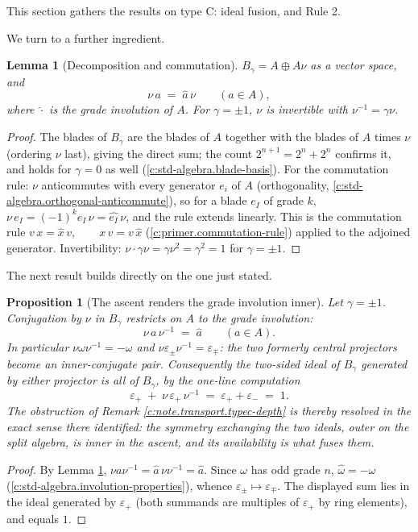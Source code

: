 \documentclass[11pt]{article}
\newtheorem{proposition}[theorem]{Proposition}
\newtheorem{lemma}[theorem]{Lemma}
\theoremstyle{definition}
\theoremstyle{plain}
\begin{document}
This section gathers the results on type C: ideal fusion, and Rule 2.

We turn to a further ingredient.

\begin{lemma}[Decomposition and commutation]\label{c:transport.decomposition-commutation}
$B_\gamma = A \oplus A\nu$ as a vector space, and
\[
\nu\, a \;=\; \hat{a}\, \nu \qquad (a \in A),
\]
where $\hat{\cdot}$ is the grade involution of $A$. For $\gamma = \pm 1$, $\nu$ is invertible with $\nu^{-1} = \gamma\nu$.
\end{lemma}
\begin{proof}
The blades of $B_\gamma$ are the blades of $A$ together with the blades of $A$ times $\nu$ (ordering $\nu$ last), giving the direct sum; the count $2^{n+1} = 2^n + 2^n$ confirms it, and holds for $\gamma = 0$ as well \cite{Chevalley1997} (\ref{c:std-algebra.blade-basis}). For the commutation rule: $\nu$ anticommutes with every generator $e_i$ of $A$ (orthogonality, \ref{c:std-algebra.orthogonal-anticommute}), so for a blade $e_I$ of grade $k$, $\nu\, e_I = (-1)^k e_I\, \nu = \hat{e_I}\,\nu$, and the rule extends linearly. This is the commutation rule $v\,x = \hat{x}\,v, \qquad x\,v = v\,\hat{x}$ (\ref{c:primer.commutation-rule}) applied to the adjoined generator. Invertibility: $\nu \cdot \gamma\nu = \gamma \nu^2 = \gamma^2 = 1$ for $\gamma = \pm 1$.

\end{proof}

The next result builds directly on the one just stated.

\begin{proposition}[The ascent renders the grade involution inner]\label{c:transport.ascent-renders-grade-involution-inner}
Let $\gamma = \pm 1$. Conjugation by $\nu$ in $B_\gamma$ restricts on $A$ to the grade involution:
\[
\nu\, a\, \nu^{-1} \;=\; \hat{a} \qquad (a \in A).
\]
In particular $\nu \omega \nu^{-1} = -\omega$ and $\nu \varepsilon_\pm \nu^{-1} = \varepsilon_\mp$: the two formerly central projectors become an inner-conjugate pair. Consequently the two-sided ideal of $B_\gamma$ generated by either projector is all of $B_\gamma$, by the one-line computation
\[
\varepsilon_+ \;+\; \nu\,\varepsilon_+\,\nu^{-1} \;=\; \varepsilon_+ + \varepsilon_- \;=\; 1 .
\]
The obstruction of Remark \ref{c:note.transport.typec-depth} is thereby resolved in the exact sense there identified: the symmetry exchanging the two ideals, outer on the split algebra, is inner in the ascent, and its availability is what fuses them.
\end{proposition}
\begin{proof}
By Lemma \ref{c:transport.decomposition-commutation}, $\nu a \nu^{-1} = \hat{a}\,\nu\nu^{-1} = \hat{a}$. Since $\omega$ has odd grade $n$, $\hat{\omega} = -\omega$ (\ref{c:std-algebra.involution-properties}), whence $\varepsilon_\pm \mapsto \varepsilon_\mp$. The displayed sum lies in the ideal generated by $\varepsilon_+$ (both summands are multiples of $\varepsilon_+$ by ring elements), and equals $1$.

\end{proof}
\end{document}
